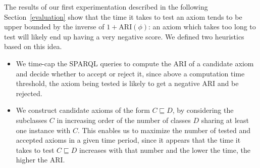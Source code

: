 \documentclass{llncs}
\begin{document}
The results of our first experimentation described in the following Section~\ref{evaluation}
show that the time it takes to test an axiom tends to be upper bounded 
by the inverse
of $1 + \mathrm{ARI}(\phi)$: an axiom which takes too long to test will likely end up having a very negative score.
We defined two heuristics based on this idea.
\begin{itemize}
\item We time-cap the SPARQL queries to compute the ARI of a candidate axiom and decide whether to accept or reject it, since above a computation time threshold, the axiom being tested is likely to get a negative ARI and be rejected.
\item We construct candidate axioms of the form $C \sqsubseteq D$, by considering
the subclasses $C$ in increasing order of the number of classes $D$ sharing at least
one instance with $C$.
This enables us to maximize the number of tested and accepted axioms in a given time period,
since it appears that the time it takes to test $C \sqsubseteq D$ increases with that number
and the lower the time, the higher the ARI.
\end{itemize}

%
%
\end{document}
